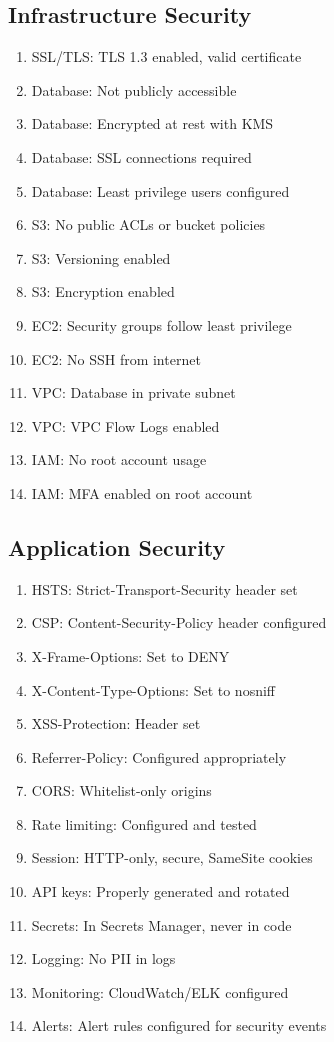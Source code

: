 \documentclass{report}
\begin{document}
\subsection{Infrastructure Security}
\begin{enumerate}
\item SSL/TLS: TLS 1.3 enabled, valid certificate
\item Database: Not publicly accessible
\item Database: Encrypted at rest with KMS
\item Database: SSL connections required
\item Database: Least privilege users configured
\item S3: No public ACLs or bucket policies
\item S3: Versioning enabled
\item S3: Encryption enabled
\item EC2: Security groups follow least privilege
\item EC2: No SSH from internet
\item VPC: Database in private subnet
\item VPC: VPC Flow Logs enabled
\item IAM: No root account usage
\item IAM: MFA enabled on root account
\end{enumerate}

\subsection{Application Security}
\begin{enumerate}
\item HSTS: Strict-Transport-Security header set
\item CSP: Content-Security-Policy header configured
\item X-Frame-Options: Set to DENY
\item X-Content-Type-Options: Set to nosniff
\item XSS-Protection: Header set
\item Referrer-Policy: Configured appropriately
\item CORS: Whitelist-only origins
\item Rate limiting: Configured and tested
\item Session: HTTP-only, secure, SameSite cookies
\item API keys: Properly generated and rotated
\item Secrets: In Secrets Manager, never in code
\item Logging: No PII in logs
\item Monitoring: CloudWatch/ELK configured
\item Alerts: Alert rules configured for security events
\end{enumerate}
\end{document}
